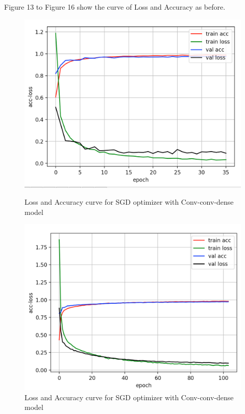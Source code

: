 \documentclass{article}
\begin{document}
Figure 13 to Figure 16 show the curve of Loss and Accuracy as before.

\begin{figure}[htbp]
\centering
\begin{minipage}[t]{0.48\textwidth}
\centering
\includegraphics[scale = 0.3]{sgd_3.png}
\caption{Loss and Accuracy curve for SGD optimizer with Conv-conv-dense model}
\end{minipage}
\begin{minipage}[t]{0.48\textwidth}
\centering
\includegraphics[scale = 0.3]{adadelta_3.png}
\caption{Loss and Accuracy curve for SGD optimizer with Conv-conv-dense model}
\end{minipage}
\end{figure}
\end{document}
